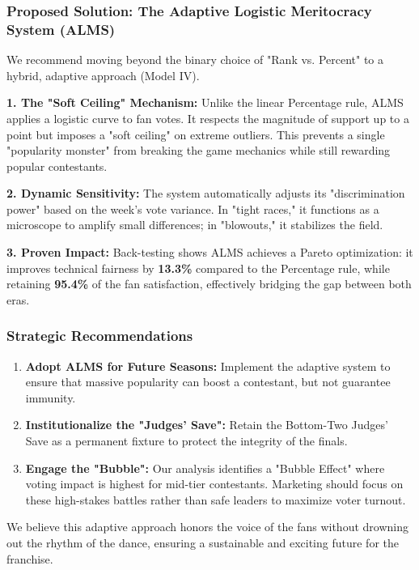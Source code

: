 \subsubsection*{Proposed Solution: The Adaptive Logistic Meritocracy System (ALMS)}

We recommend moving beyond the binary choice of "Rank vs. Percent" to a hybrid, adaptive approach (Model IV).

\textbf{1. The "Soft Ceiling" Mechanism:}
Unlike the linear Percentage rule, ALMS applies a logistic curve to fan votes. It respects the magnitude of support up to a point but imposes a "soft ceiling" on extreme outliers. This prevents a single "popularity monster" from breaking the game mechanics while still rewarding popular contestants.

\textbf{2. Dynamic Sensitivity:}
The system automatically adjusts its "discrimination power" based on the week's vote variance. In "tight races," it functions as a microscope to amplify small differences; in "blowouts," it stabilizes the field.

\textbf{3. Proven Impact:}
Back-testing shows ALMS achieves a Pareto optimization: it improves technical fairness by \textbf{13.3\%} compared to the Percentage rule, while retaining \textbf{95.4\%} of the fan satisfaction, effectively bridging the gap between both eras.

\subsubsection*{Strategic Recommendations}

\begin{enumerate}
    \item \textbf{Adopt ALMS for Future Seasons:} Implement the adaptive system to ensure that massive popularity can boost a contestant, but not guarantee immunity.
    \item \textbf{Institutionalize the "Judges' Save":} Retain the Bottom-Two Judges' Save as a permanent fixture to protect the integrity of the finals.
    \item \textbf{Engage the "Bubble":} Our analysis identifies a "Bubble Effect" where voting impact is highest for mid-tier contestants. Marketing should focus on these high-stakes battles rather than safe leaders to maximize voter turnout.
\end{enumerate}

We believe this adaptive approach honors the voice of the fans without drowning out the rhythm of the dance, ensuring a sustainable and exciting future for the franchise.
